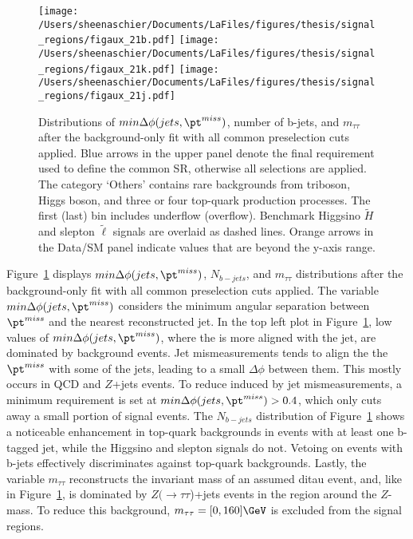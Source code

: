     \begin{figure}%
  \begin{center}
  \texttt{[image: /Users/sheenaschier/Documents/LaFiles/figures/thesis/signal\_regions/figaux\_21b.pdf]}
   \texttt{[image: /Users/sheenaschier/Documents/LaFiles/figures/thesis/signal\_regions/figaux\_21k.pdf]}
      \texttt{[image: /Users/sheenaschier/Documents/LaFiles/figures/thesis/signal\_regions/figaux\_21j.pdf]}
   \end{center}
 \caption{Distributions of $min\Delta\phi(jets, \pt^{miss})$, number of b-jets, and $m_{\tau\tau}$ after the background-only fit with all common preselection cuts applied.  Blue arrows in the upper panel denote the final requirement used to define the common SR, otherwise all selections are applied. The category `Others' contains rare backgrounds from triboson, Higgs boson, and three or four top-quark production processes. The first (last) bin includes underflow (overflow).  Benchmark Higgsino $\tilde H$ and slepton $\tilde\ell$ signals are overlaid as dashed lines. Orange arrows in the Data/SM panel indicate values that are beyond the y-axis range.}
 \label{fig:sr:cm3}
 \end{figure}
Figure~\ref{fig:sr:cm3} displays $min\Delta\phi(jets, \pt^{miss})$, $N_{b-jets}$, and $m_{\tau\tau}$ distributions after the background-only fit with all common preselection cuts applied.  The variable $min\Delta\phi(jets, \pt^{miss})$ considers the minimum angular separation between $\pt^{miss}$ and the nearest reconstructed jet.  In the top left plot in Figure~\ref{fig:sr:cm3}, low values of $min\Delta\phi(jets, \pt^{miss})$, where the \met is more aligned with the jet, are dominated by background events.  Jet mismeasurements tends to align the the $\pt^{miss}$ with some of the jets, leading to a small $\Delta\phi$ between them.  This mostly occurs in QCD and $Z$+jets events.  To reduce \met{} induced by jet mismeasurements, a minimum requirement is set at $min\Delta\phi(jets, \pt^{miss}) > 0.4$, which only cuts away a small portion of signal events.  The $N_{b-jets}$ distribution of Figure~\ref{fig:sr:cm3} shows a noticeable enhancement in top-quark backgrounds in events with at least one b-tagged jet, while the Higgsino and slepton signals do not.  Vetoing on events with b-jets effectively discriminates against top-quark backgrounds.  Lastly, the variable $m_{\tau\tau}$ reconstructs the invariant mass of an assumed ditau event, and, like in Figure~\ref{fig:sr:cm3}, is dominated by $Z(\rightarrow\tau\tau$)+jets events in the region around the $Z$-mass.  To reduce this background, $m_{\tau\tau} = [0, 160]\GeV$ is excluded from the signal regions.  
 
